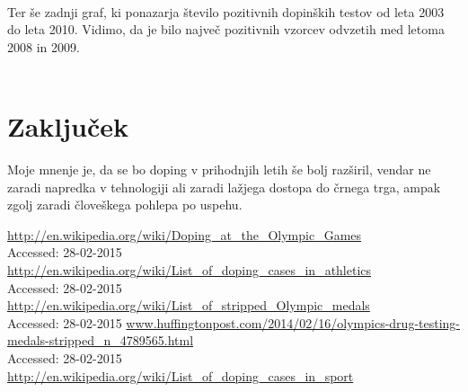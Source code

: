 \documentclass[11pt,a4paper]{article}
\begin{document}
\
\\
Ter še zadnji graf, ki ponazarja število pozitivnih dopinških testov od leta 2003 do leta 2010. Vidimo, da je bilo največ pozitivnih vzorcev odvzetih med letoma 2008 in 2009.
\\
\\

\newpage
\section{Zaključek}
Moje mnenje je, da se bo doping v prihodnjih letih še bolj razširil, vendar ne zaradi napredka v tehnologiji ali zaradi lažjega dostopa do črnega trga, ampak zgolj zaradi človeškega pohlepa po uspehu.

\newpage
\begin{thebibliography}{4}
  \url{http://en.wikipedia.org/wiki/Doping_at_the_Olympic_Games}\\
  {Accessed: 28-02-2015}
  \url{http://en.wikipedia.org/wiki/List_of_doping_cases_in_athletics}\\
  {Accessed: 28-02-2015}
  \url{http://en.wikipedia.org/wiki/List_of_stripped_Olympic_medals}\\
  {Accessed: 28-02-2015}
  \url{www.huffingtonpost.com/2014/02/16/olympics-drug-testing-medals-stripped_n_4789565.html}\\
  {Accessed: 28-02-2015}
  \url{http://en.wikipedia.org/wiki/List_of_doping_cases_in_sport}
 

\end{thebibliography}
\end{document}
